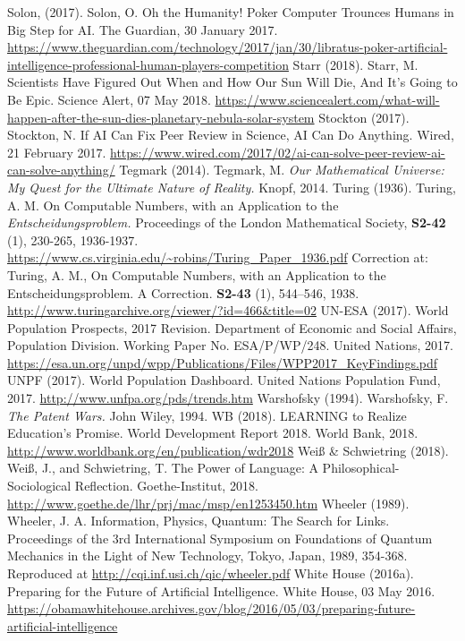 \begin{multicols}{2}
\begin{thebibliography}{99}
 Solon, (2017). Solon, O. Oh the Humanity! Poker Computer Trounces Humans in Big Step for AI. The Guardian, 30 January 2017. \url{https://www.theguardian.com/technology/2017/jan/30/libratus-poker-artificial-intelligence-professional-human-players-competition}
 Starr (2018). Starr, M. Scientists Have Figured Out When and How Our Sun Will Die, And It's Going to Be Epic. Science Alert, 07 May 2018. \url{https://www.sciencealert.com/what-will-happen-after-the-sun-dies-planetary-nebula-solar-system}
 Stockton (2017). Stockton, N. If AI Can Fix Peer Review in Science, AI Can Do Anything. Wired, 21 February 2017. \url{https://www.wired.com/2017/02/ai-can-solve-peer-review-ai-can-solve-anything/}
 Tegmark (2014). Tegmark, M. \textit{Our Mathematical Universe: My Quest for the Ultimate Nature of Reality.} Knopf, 2014.
 Turing (1936). Turing, A. M. On Computable Numbers, with an Application to the \textit{Entscheidungsproblem.} Proceedings of the London Mathematical Society, \textbf{S2-42} (1), 230-265, 1936-1937. \url{https://www.cs.virginia.edu/~robins/Turing_Paper_1936.pdf} Correction at: Turing, A. M., On Computable Numbers, with an Application to the Entscheidungsproblem. A Correction. \textbf{S2-43} (1), 544–546, 1938. \url{http://www.turingarchive.org/viewer/?id=466&title=02}
 UN-ESA (2017). World Population Prospects, 2017 Revision. Department of Economic and Social Affairs, Population Division. Working Paper No. ESA/P/WP/248. United Nations, 2017. \url{https://esa.un.org/unpd/wpp/Publications/Files/WPP2017_KeyFindings.pdf}
 UNPF (2017). World Population Dashboard. United Nations Population Fund, 2017. \url{http://www.unfpa.org/pds/trends.htm}
 Warshofsky (1994). Warshofsky, F. \textit{The Patent Wars.} John Wiley, 1994.
 WB (2018). LEARNING to Realize Education’s Promise. World Development Report 2018. World Bank, 2018. \url{http://www.worldbank.org/en/publication/wdr2018}
 Weiß \& Schwietring (2018). Weiß, J., and Schwietring, T. The Power of Language: A Philosophical-Sociological Reflection. Goethe-Institut, 2018. \url{http://www.goethe.de/lhr/prj/mac/msp/en1253450.htm}
 Wheeler (1989). Wheeler, J. A. Information, Physics, Quantum: The Search for Links. Proceedings of the 3rd International Symposium on Foundations of Quantum Mechanics in the Light of New Technology, Tokyo, Japan, 1989, 354-368. Reproduced at \url{http://cqi.inf.usi.ch/qic/wheeler.pdf}
 White House (2016a). Preparing for the Future of Artificial Intelligence. White House, 03 May 2016. \url{https://obamawhitehouse.archives.gov/blog/2016/05/03/preparing-future-artificial-intelligence}

\end{thebibliography}
\end{multicols}
